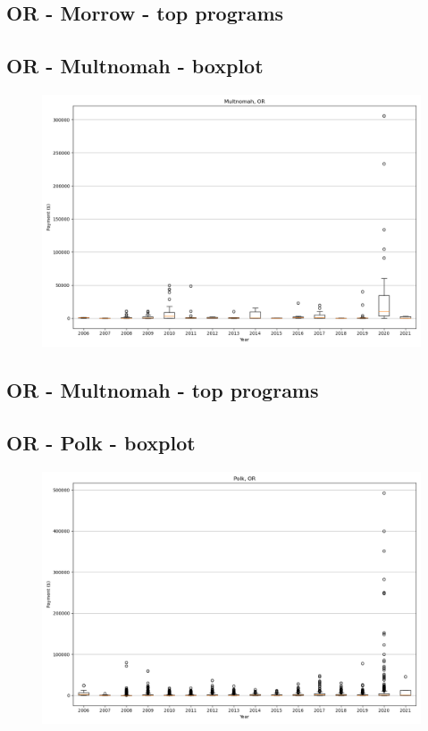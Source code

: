 \subsection*{OR - Morrow - top programs}

\newpage
\subsection*{OR - Multnomah - boxplot}
\begin{figure}[h]
\centering
\includegraphics[width=7in]{../output/boxplots/counties/Multnomah-OR_boxplot.png}
\end{figure}


\subsection*{OR - Multnomah - top programs}

\newpage
\subsection*{OR - Polk - boxplot}
\begin{figure}[h]
\centering
\includegraphics[width=7in]{../output/boxplots/counties/Polk-OR_boxplot.png}
\end{figure}



